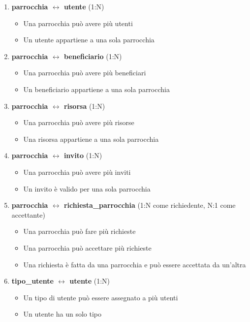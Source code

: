 \documentclass[11pt,a4paper]{article}
\begin{document}
\begin{enumerate}[leftmargin=*]
\item \textbf{parrocchia $\leftrightarrow$ utente} (1:N)
   \begin{itemize}
   \item Una parrocchia può avere più utenti
   \item Un utente appartiene a una sola parrocchia
   \end{itemize}

\item \textbf{parrocchia $\leftrightarrow$ beneficiario} (1:N)
   \begin{itemize}
   \item Una parrocchia può avere più beneficiari
   \item Un beneficiario appartiene a una sola parrocchia
   \end{itemize}

\item \textbf{parrocchia $\leftrightarrow$ risorsa} (1:N)
   \begin{itemize}
   \item Una parrocchia può avere più risorse
   \item Una risorsa appartiene a una sola parrocchia
   \end{itemize}

\item \textbf{parrocchia $\leftrightarrow$ invito} (1:N)
   \begin{itemize}
   \item Una parrocchia può avere più inviti
   \item Un invito è valido per una sola parrocchia
   \end{itemize}

\item \textbf{parrocchia $\leftrightarrow$ richiesta\_parrocchia} (1:N come richiedente, N:1 come accettante)
   \begin{itemize}
   \item Una parrocchia può fare più richieste
   \item Una parrocchia può accettare più richieste
   \item Una richiesta è fatta da una parrocchia e può essere accettata da un'altra
   \end{itemize}

\item \textbf{tipo\_utente $\leftrightarrow$ utente} (1:N)
   \begin{itemize}
   \item Un tipo di utente può essere assegnato a più utenti
   \item Un utente ha un solo tipo
   \end{itemize}


\end{enumerate}
\end{document}
